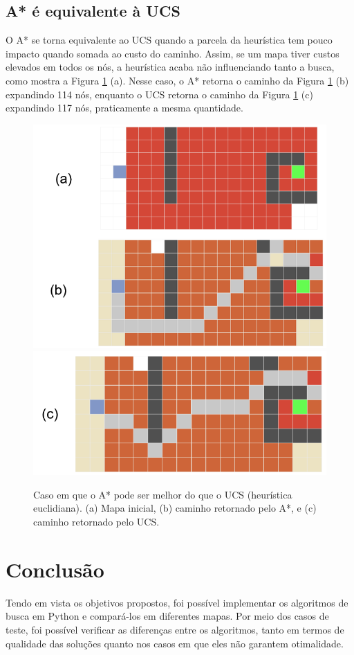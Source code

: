 \documentclass[letterpaper]{article} %
\begin{document}
\subsection{A* é equivalente à UCS}

O A* se torna equivalente ao UCS quando a parcela da heurística tem pouco 
impacto quando somada ao custo do caminho. Assim, se um mapa tiver custos elevados 
em todos os nós, a heurística acaba não influenciando tanto a busca, como mostra a
Figura \ref{fig:astar_equiv_ucs} (a). Nesse caso, o A* retorna o caminho da Figura 
\ref{fig:astar_equiv_ucs} (b) expandindo 114 nós, enquanto o UCS retorna o caminho da 
Figura \ref{fig:astar_equiv_ucs} (c) expandindo 117 nós, praticamente a mesma quantidade.

\begin{figure}[htb]
	\centering 
    \caption{Caso em que o A* pode ser melhor do que o UCS (heurística euclidiana). (a) Mapa inicial, 
	(b) caminho retornado pelo A*, e (c)
	caminho retornado pelo UCS.}
	\includegraphics[width=\columnwidth]{images/astar_equiv_ucs_p1.png}
	\includegraphics[width=\columnwidth]{images/astar_equiv_ucs_p2.png}
	\label{fig:astar_equiv_ucs}
\end{figure}


\section{Conclusão}

Tendo em vista os objetivos propostos, foi possível implementar os algoritmos de busca
em Python e compará-los em diferentes mapas. Por meio dos casos de teste, foi possível
verificar as diferenças entre os algoritmos, tanto em termos de qualidade das soluções quanto
nos casos em que eles não garantem otimalidade.



\end{document}
